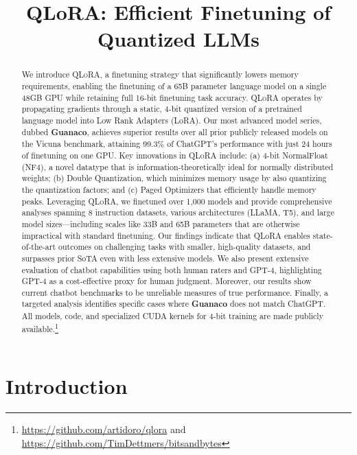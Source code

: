 \title{QLoRA: Efficient Finetuning of Quantized LLMs}

\begin{abstract}
We introduce \textsc{QLoRA}, a finetuning strategy that significantly lowers memory requirements, enabling the finetuning of a 65B parameter language model on a single 48GB GPU while retaining full 16-bit finetuning task accuracy. \textsc{QLoRA} operates by propagating gradients through a static, 4-bit quantized version of a pretrained language model into Low Rank Adapters (LoRA). Our most advanced model series, dubbed \textbf{Guanaco}, achieves superior results over all prior publicly released models on the Vicuna benchmark, attaining 99.3\% of ChatGPT’s performance with just 24 hours of finetuning on one GPU. Key innovations in \textsc{QLoRA} include: (a) 4-bit NormalFloat (NF4), a novel datatype that is information-theoretically ideal for normally distributed weights; (b) Double Quantization, which minimizes memory usage by also quantizing the quantization factors; and (c) Paged Optimizers that efficiently handle memory peaks. Leveraging \textsc{QLoRA}, we finetuned over 1,000 models and provide comprehensive analyses spanning 8 instruction datasets, various architectures (LLaMA, T5), and large model sizes—including scales like 33B and 65B parameters that are otherwise impractical with standard finetuning. Our findings indicate that QLoRA enables state-of-the-art outcomes on challenging tasks with smaller, high-quality datasets, and surpasses prior SoTA even with less extensive models. We also present extensive evaluation of chatbot capabilities using both human raters and GPT-4, highlighting GPT-4 as a cost-effective proxy for human judgment. Moreover, our results show current chatbot benchmarks to be unreliable measures of true performance. Finally, a targeted analysis identifies specific cases where \textbf{Guanaco} does not match ChatGPT. All models, code, and specialized CUDA kernels for 4-bit training are made publicly available.\footnote{\url{https://github.com/artidoro/qlora} and \url{https://github.com/TimDettmers/bitsandbytes}}
\end{abstract}

\section{Introduction}

